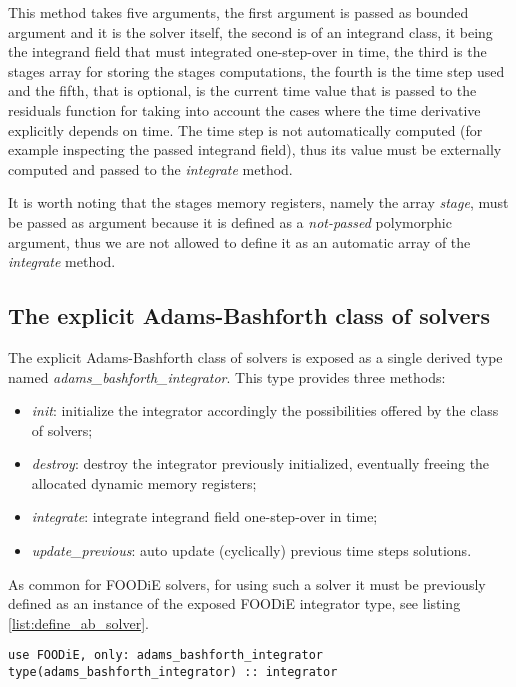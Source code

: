 \documentclass[pdftex,preprint,3p,times,numbers]{elsarticle}
\begin{document}
This method takes five arguments, the first argument is passed as bounded argument and it is the solver itself, the second is of an integrand class, it being the integrand field that must integrated one-step-over in time, the third is the stages array for storing the stages computations, the fourth is the time step used and the fifth, that is optional, is the current time value that is passed to the residuals function for taking into account the cases where the time derivative explicitly depends on time. The time step is not automatically computed (for example inspecting the passed integrand field), thus its value must be externally computed and passed to the \emph{integrate} method.

It is worth noting that the stages memory registers, namely the array \emph{stage}, must be passed as argument because it is defined as a \emph{not-passed} polymorphic argument, thus we are not allowed to define it as an automatic array of the \emph{integrate} method.

\subsection{The explicit Adams-Bashforth class of solvers}\label{subsec:solver_ab}

The explicit Adams-Bashforth class of solvers is exposed as a single derived type named \emph{adams\_bashforth\_integrator}. This type provides three methods:

\begin{itemize}
  \item \emph{init}: initialize the integrator accordingly the possibilities offered by the class of solvers;
  \item \emph{destroy}: destroy the integrator previously initialized, eventually freeing the allocated dynamic memory registers;
  \item \emph{integrate}: integrate integrand field one-step-over in time;
  \item \emph{update\_previous}: auto update (cyclically) previous time steps solutions.
  \end{itemize}

As common for FOODiE solvers, for using such a solver it must be previously defined as an instance of the exposed FOODiE integrator type, see listing \ref{list:define_ab_solver}.

\begin{lstlisting}[firstnumber=1,style=code,caption={definition of an explicit Adams-Bashforth integrator},label={list:define_ab_solver}]
use FOODiE, only: adams_bashforth_integrator
type(adams_bashforth_integrator) :: integrator
\end{lstlisting}
\end{document}
